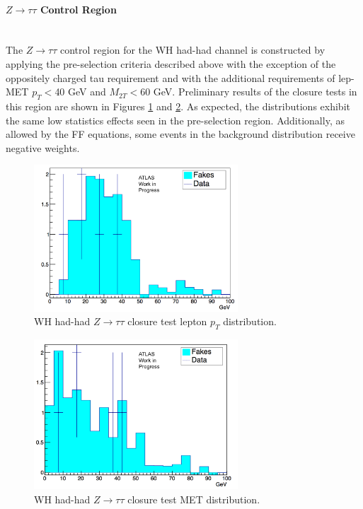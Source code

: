\paragraph{$Z\rightarrow\tau\tau$ Control Region}\mbox{} \\

The $Z\rightarrow\tau\tau$ control region for the WH had-had channel is constructed by applying the pre-selection criteria described above with the exception of the oppositely charged tau requirement and with the additional requirements of lep-MET $p_T<$40 GeV and $M_{2T}<60$ GeV. Preliminary results of the closure tests in this region are shown in Figures \ref{fig:leppt_ztautau} and \ref{fig:met_ztautau}. As expected, the distributions exhibit the same low statistics effects seen in the pre-selection region. Additionally, as allowed by the FF equations, some events in the background distribution receive negative weights.

\begin{figure}[htb!]
    \centering
    \includegraphics[width=3in]{figures/chapter7/lep_pt_wh_ztautau.png}
    \caption{WH had-had $Z\rightarrow\tau\tau$ closure test lepton $p_T$ distribution.}
    \label{fig:leppt_ztautau}
\end{figure}

\begin{figure}[htb!]
    \centering
    \includegraphics[width=3in]{figures/chapter7/met_wh_ztautau.png}
    \caption{WH had-had $Z\rightarrow\tau\tau$ closure test MET distribution.}
    \label{fig:met_ztautau}
\end{figure}
